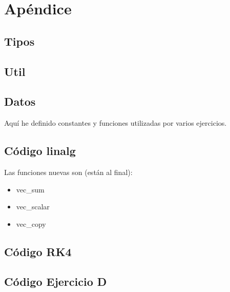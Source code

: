 \section{Apéndice} 

\subsection{Tipos}\label{code:types}


\newpage

\subsection{Util}\label{code:util}


\newpage

\subsection{Datos}\label{code:data}

Aquí he definido constantes y funciones utilizadas por varios ejercicios.


\newpage


\subsection{Código linalg}
\label{code:linalg}

Las funciones nuevas son (están al final): 
\begin{itemize}
	\item vec\_sum
	\item vec\_scalar
	\item vec\_copy
\end{itemize}


\newpage

\subsection{Código RK4}
\label{code:rk4}


\newpage

\subsection{Código Ejercicio D}
\label{code:ex4}


\newpage